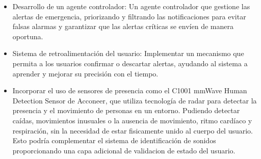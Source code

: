 \begin{itemize}
  \item Desarrollo de un agente controlador: Un agente controlador que gestione las alertas de emergencia, priorizando y filtrando las notificaciones para evitar falsas alarmas y garantizar que las alertas críticas se envíen de manera oportuna.
  \item Sistema de retroalimentación del usuario: Implementar un mecanismo que permita a los usuarios confirmar o descartar alertas, ayudando al sistema a aprender y mejorar su precisión con el tiempo.
  \item Incorporar el uso de sensores de presencia como el C1001 mmWave Human Detection Sensor de Acconeer, que utiliza tecnología de radar para detectar la presencia y el movimiento de personas en un entorno. Pudiendo detectar caídas, movimientos inusuales o la ausencia de movimiento, ritmo cardíaco y respiración, sin la necesidad de estar fisicamente unido al cuerpo del usuario. Esto podría complementar el sistema de identificación de sonidos proporcionando una capa adicional de validacion de estado del usuario.
\end{itemize}
